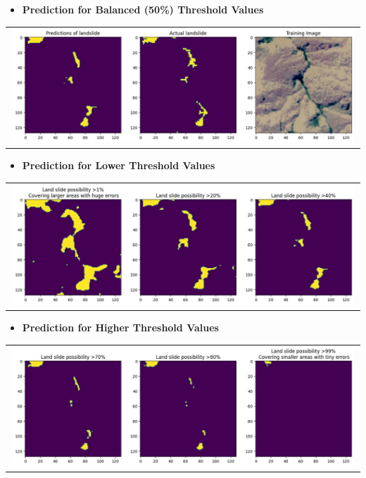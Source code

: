 \documentclass[12pt,a4paper]{report}
\begin{document}
\begin{itemize}
		\item \textbf{Prediction for Balanced (50\%) Threshold Values}
\end{itemize}  
		\begin{tabular}{c}
\includegraphics[width=0.99\textwidth]{th_balanced}
    \end{tabular}    
\begin{itemize}
		\item \textbf{Prediction for Lower Threshold Values}
\end{itemize}  
		\begin{tabular}{c}
\includegraphics[width=0.99\textwidth]{th_lower}
    \end{tabular}
   \begin{itemize}
		\item \textbf{Prediction for Higher Threshold Values}
\end{itemize}  
		\begin{tabular}{c}
\includegraphics[width=0.99\textwidth]{th_higher}
    \end{tabular}
    
\end{document}
